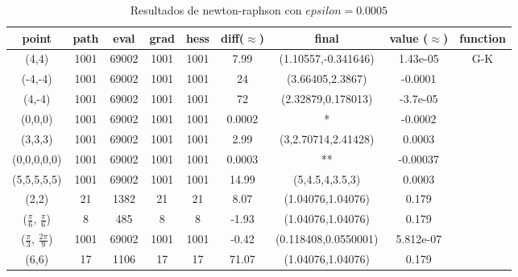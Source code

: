 \documentclass[10pt]{article}
\theoremstyle{definition}
\begin{document}
\begin{table}[H]
\hfill\begin{tabular}{|c|ccccccc|c|} \hline
\bf point                           & \bf path & \bf eval & \bf grad & \bf hess & \bf diff($\approx$) & \bf final                    & \bf value ($\approx$) & \bf function               \\\hline\hline
(4,4)                               & 1001     & 69002    & 1001     & 1001     & 7.99                & (1.10557,-0.341646)          & 1.43e-05              & \multirow{8}{*}{G-K}       \\
(-4,-4)                             & 1001     & 69002    & 1001     & 1001     & 24                  & (3.66405,2.3867)             & -0.0001               &                            \\
(4,-4)                              & 1001     & 69002    & 1001     & 1001     & 72                  & (2.32879,0.178013)           & -3.7e-05              &                            \\
(0,0,0)                             & 1001     & 69002    & 1001     & 1001     & 0.0002              & * & -0.0002               &                            \\
(3,3,3)                             & 1001     & 69002    & 1001     & 1001     & 2.99                & (3,2.70714,2.41428)          & 0.0003                &                            \\
(0,0,0,0,0)                         & 1001     & 69002    & 1001     & 1001     & 0.0003              & **                            & -0.00037              &                            \\
(5,5,5,5,5)                         & 1001     & 69002    & 1001     & 1001     & 14.99               & (5,4.5,4,3.5,3)              & 0.0003                &                            \\ \hline\hline
(2,2)                               & 21       & 1382     & 21       & 21       & 8.07                & (1.04076,1.04076)            & 0.179                 & \multirow{4}{*}{rastrigin} \\
($\frac{\pi}{6}$, $\frac{\pi}{6}$)  & 8        & 485      & 8        & 8        & -1.93               & (1.04076,1.04076)            & 0.179                 &                            \\
($\frac{\pi}{3}$, $\frac{2\pi}{9}$) & 1001     & 69002    & 1001     & 1001     & -0.42               & (0.118408,0.0550001)         & 5.812e-07             &                            \\
(6,6)                               & 17       & 1106     & 17       & 17       & 71.07               & (1.04076,1.04076)            & 0.179                 &                            \\ \hline
\end{tabular}\hfill\hbox{}

\caption{Resultados de newton-raphson con $epsilon=0.0005$}\label{tab:newt}
\end{table}
\end{document}
